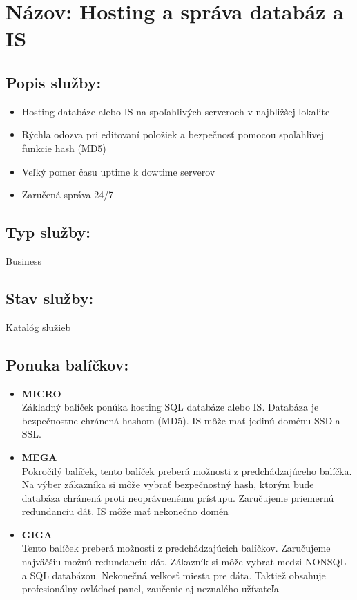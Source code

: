 \documentclass[a4paper, 11pt]{article}
\begin{document}
\section*{Názov: Hosting a správa databáz a IS}
\subsection*{Popis služby:}
\begin{itemize}
\item Hosting databáze alebo IS na spoľahlivých serveroch v najbližšej lokalite
\item Rýchla odozva pri editovaní položiek a bezpečnosť pomocou spoľahlivej funkcie hash (MD5)
\item Veľký pomer času uptime k dowtime serverov
\item Zaručená správa 24/7
\end{itemize}
\subsection*{Typ služby:}
Business
\subsection*{Stav služby:}
Katalóg služieb
\subsection*{Ponuka balíčkov:}
\begin{itemize}
\item \textbf{MICRO}\\
Základný balíček ponúka hosting SQL databáze alebo IS. Databáza je bezpečnostne chránená hashom (MD5). IS môže mať jedinú doménu SSD a SSL.
\item \textbf{MEGA}\\
Pokročilý balíček, tento balíček preberá možnosti z predchádzajúceho balíčka. Na výber zákazníka si môže vybrať bezpečnostný hash, ktorým bude databáza chránená proti neoprávnenému prístupu. Zaručujeme priemernú redundanciu dát. IS môže mať nekonečno domén
\item \textbf{GIGA}\\
Tento balíček preberá možnosti z predchádzajúcich balíčkov. Zaručujeme najväčšiu možnú redundanciu dát. Zákazník si môže vybrať medzi NONSQL a SQL databázou. Nekonečná veľkosť miesta pre dáta. Taktiež obsahuje profesionálny ovládací panel, zaučenie aj neznalého užívateľa
\end{itemize}
\end{document}

